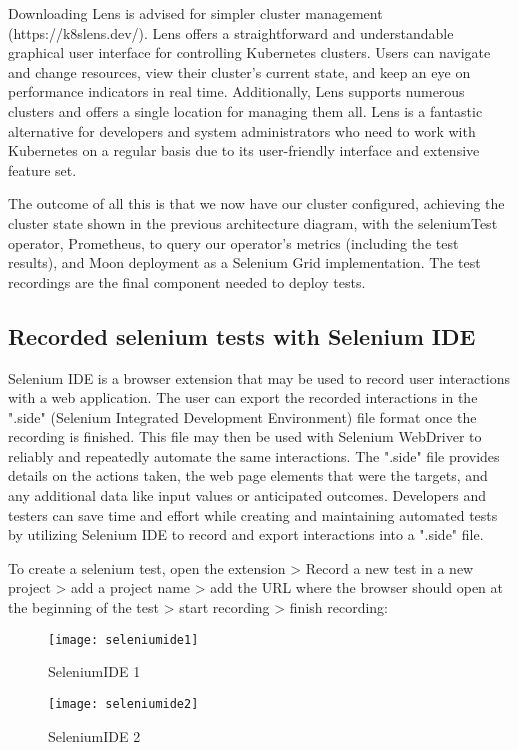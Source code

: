 Downloading Lens is advised for simpler cluster management (https://k8slens.dev/). Lens offers a straightforward and understandable graphical user interface for controlling Kubernetes clusters. Users can navigate and change resources, view their cluster's current state, and keep an eye on performance indicators in real time. Additionally, Lens supports numerous clusters and offers a single location for managing them all. Lens is a fantastic alternative for developers and system administrators who need to work with Kubernetes on a regular basis due to its user-friendly interface and extensive feature set.

The outcome of all this is that we now have our cluster configured, achieving the cluster state shown in the previous architecture diagram, with the seleniumTest operator, Prometheus, to query our operator's metrics (including the test results), and Moon deployment as a Selenium Grid implementation. The test recordings are the final component needed to deploy tests.

\subsection{Recorded selenium tests with Selenium IDE}

Selenium IDE is a browser extension that may be used to record user interactions with a web application. The user can export the recorded interactions in the ".side" (Selenium Integrated Development Environment) file format once the recording is finished. This file may then be used with Selenium WebDriver to reliably and repeatedly automate the same interactions. The ".side" file provides details on the actions taken, the web page elements that were the targets, and any additional data like input values or anticipated outcomes. Developers and testers can save time and effort while creating and maintaining automated tests by utilizing Selenium IDE to record and export interactions into a ".side" file.

To create a selenium test, open the extension > Record a new test in a new project > add a project name > add the URL where the browser should open at the beginning of the test > start recording > finish recording:

\begin{figure}[H]
	\centering
	\texttt{[image: seleniumide1]}
	\label{fig:seleniumide1}
	\caption{SeleniumIDE 1}
\end{figure}

\begin{figure}[H]
	\centering
	\texttt{[image: seleniumide2]}
	\label{fig:seleniumide2}
	\caption{SeleniumIDE 2}
\end{figure}

